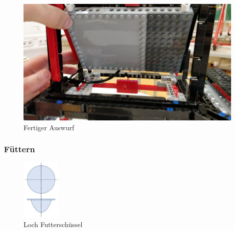 \begin{figure}[H]
\begin{center}
\includegraphics[width=13cm]{Bilder/Ablauf_1_png/Auswurf_5}
\caption{Fertiger Auswurf}
\label{Fertiger Auswurf}
\end{center}
\end{figure}

\subsubsection{Füttern}

\begin{figure}
\vspace{-40pt}
  \begin{center}
    \includegraphics[width=0.17\textwidth]{Bilder/Powerpoint/Loch_Futterschuessel}
  \end{center}
  \caption{Loch Futterschüssel}
  \label{Loch_Futterschuessel}
  \vspace{-10pt}
\end{figure}

